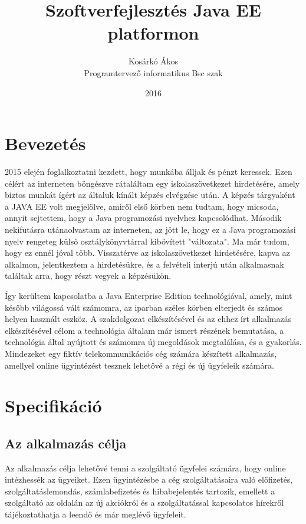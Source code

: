 \documentclass[centeredchapter]{thesis-ekf}
\institute{Matematikai és Informatikai Intézet}
\title{Szoftverfejlesztés Java EE platformon}
\author{Kosárkó Ákos \\ Programtervező informatikus Bsc szak}
\date{2016}
\theoremstyle{definition}
\theoremstyle{remark}
\begin{document}
\maketitle
\tableofcontents

\chapter*{Bevezetés}

2015 elején foglalkoztatni kezdett, hogy munkába álljak és pénzt keressek. Ezen célért az interneten böngészve rátaláltam egy iskolaszövetkezet hirdetésére, amely biztos munkát ígért az általuk kínált képzés elvégzése után. A képzés tárgyaként a JAVA EE volt megjelölve, amiről első körben nem tudtam, hogy micsoda, annyit sejtettem, hogy a Java programozási nyelvhez kapcsolódhat. Második nekifutásra utánaolvastam az interneten, az jött le, hogy ez a Java programozási nyelv rengeteg külső osztálykönyvtárral kibővített "változata". Ma már tudom, hogy ez ennél jóval több. Visszatérve az iskolaszövetkezet hirdetésére, kapva az alkalmon, jelentkeztem a hirdetésükre, és a felvételi interjú után alkalmasnak találtak arra, hogy részt vegyek a képzésükön. 

Így kerültem kapcsolatba a Java Enterprise Edition technológiával, amely, mint később világossá vált számomra, az iparban széles körben elterjedt és számos helyen használt eszköz. A szakdolgozat elkészítésével és az ehhez írt alkalmazás elkészítésével célom a technológia általam már ismert részének bemutatása, a technológia által nyújtott és számomra új megoldások megtalálása, és a gyakorlás. Mindezeket egy fiktív telekommunikációs cég számára készített alkalmazás, amellyel online ügyintézést tesznek lehetővé a régi és új ügyfeleik számára.

\chapter{Specifikáció}

\section{Az alkalmazás célja}

Az alkalmazás célja lehetővé tenni a szolgáltató ügyfelei számára, hogy online intézhessék az ügyeiket. Ezen ügyintézésbe a cég szolgáltatásaira való előfizetés, szolgáltatáslemondás, számlabefizetés és hibabejelentés tartozik, emellett a szolgáltató az oldalán az új akciókról és a szolgáltatással kapcsolatos hírekről tájékoztathatja a leendő és már meglévő ügyfeleit. 
\end{document}
